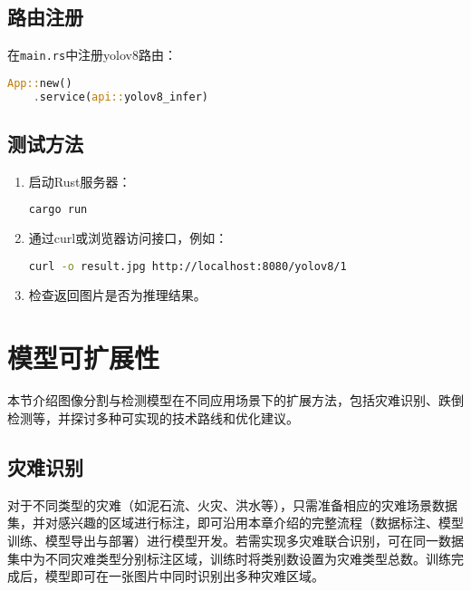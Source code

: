 \subsection{路由注册}

在\texttt{main.rs}中注册yolov8路由：

\begin{lstlisting}[language=Rust]
App::new()
    .service(api::yolov8_infer)
\end{lstlisting}

\subsection{测试方法}

\begin{enumerate}
    \item 启动Rust服务器：
    \begin{lstlisting}[language=bash]
cargo run
    \end{lstlisting}
    \item 通过curl或浏览器访问接口，例如：
    \begin{lstlisting}[language=bash]
curl -o result.jpg http://localhost:8080/yolov8/1
    \end{lstlisting}
    \item 检查返回图片是否为推理结果。
\end{enumerate}

\section{模型可扩展性}

本节介绍图像分割与检测模型在不同应用场景下的扩展方法，包括灾难识别、跌倒检测等，并探讨多种可实现的技术路线和优化建议。

\subsection{灾难识别}

对于不同类型的灾难（如泥石流、火灾、洪水等），只需准备相应的灾难场景数据集，并对感兴趣的区域进行标注，即可沿用本章介绍的完整流程（数据标注、模型训练、模型导出与部署）进行模型开发。若需实现多灾难联合识别，可在同一数据集中为不同灾难类型分别标注区域，训练时将类别数设置为灾难类型总数。训练完成后，模型即可在一张图片中同时识别出多种灾难区域。

